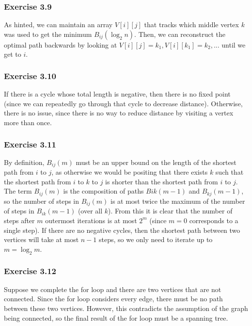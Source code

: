 \subsubsection{Exercise 3.9}
As hinted, we can maintain an array $V[i][j]$ that tracks which middle vertex $k$ was used to get the minimum 
$B_{ij}(\log_2 n)$. Then, we can reconstruct the optimal path backwards by looking at
$V[i][j] = k_1, V[i][k_1] = k_2, ...$ until we get to $i$.

\subsubsection{Exercise 3.10}
If there is a cycle whose total length is negative, then there is no fixed point (since we can repeatedly go
through that cycle to decrease distance). Otherwise, there is no issue, since there is no way to reduce
distance by visiting a vertex more than once.

\subsubsection{Exercise 3.11}
By definition, $B_{ij}(m)$ must be an upper bound on the length of the shortest path from $i$ to $j$, as 
otherwise we would be positing that there exists $k$ such that the shortest path from $i$ to $k$ to $j$ is
shorter than the shortest path from  $i$ to  $j$. The term $B_{ij}(m)$ is the composition of paths 
$B{ik}(m-1)$ and  $B_{kj}(m-1)$, so the number of steps in $B_{ij}(m)$ is at most twice the maximum of
the number of steps in $B_{ik}(m-1)$ (over all $k$). From this it is clear that the number of steps after
$m$ outermost iterations is at most $2^m$ (since $m = 0$ corresponds to a single step). If there are no
negative cycles, then the shortest path between two vertices will take at most $n-1$ steps, so we only need
to iterate up to $m = \log_2 m$.

\subsubsection{Exercise 3.12}
Suppose we complete the for loop and there are two vertices that are not connected. Since the for loop 
considers every edge, there must be no path between these two vertices. However, this contradicts the
assumption of the graph being connected, so the final result of the for loop must be a spanning tree.

